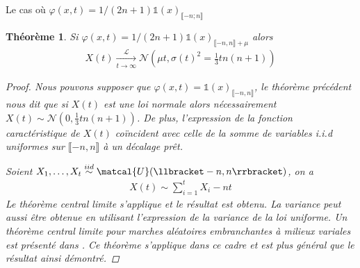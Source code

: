 \documentclass{article}
\newtheorem{theorem}{Théorème}[section]
\theoremstyle{definition}
\begin{document}
\begin{section}{Le cas où $\varphi(x, t) = 1/(2n+1)\mathds{1}(x)_{\llbracket -n; n\rrbracket}$}
%
%
%
%
%
\begin{theorem}
	Si $\varphi(x,t) = 1/(2n+1)\mathds{1}(x)_{\llbracket -n,n\rrbracket+\mu}$ alors
	\begin{align*}
		X(t) \underset{t\to \infty}{\overset{\mathcal{L}}{\to}} \mathcal{N}(\mu t, \sigma(t)^2 = \frac{1}{3}tn(n+1))
	\end{align*}
	\begin{proof}
		Nous pouvons supposer que $\varphi(x,t)=\mathds{1}(x)_{\llbracket -n,n\rrbracket}$, le théorème précédent nous dit que si $X(t)$ est une loi normale alors nécessairement $X(t)\sim \mathcal{N}(0, \frac{1}{3}tn(n+1))$.
	De plus, l'expression de la fonction caractéristique de $X(t)$ coïncident avec celle de la somme de variables i.i.d uniformes sur $\llbracket -n, n\rrbracket$ à un décalage prêt. 
	
	Soient $X_1, \ldots, X_t\overset{iid}{\sim} \matcal{U}(\llbracket-n,n\rrbracket)$, on a
	\begin{align*}
		X(t) \sim \sum_{i=1}^t X_i - n t
	\end{align*}
	Le théorème central limite s'applique et le résultat est obtenu. La variance peut aussi être obtenue en utilisant l'expression de la variance de la loi uniforme. Un théorème central limite pour marches aléatoires embranchantes à milieux variales est présenté dans \cite{10.2307/1426526}. Ce théorème s'applique dans ce cadre et est plus général que le résultat ainsi démontré.
\end{proof}
	

\end{theorem}
\end{section}
\end{document}
